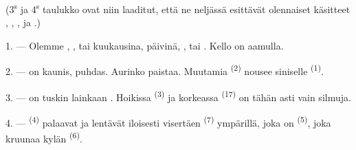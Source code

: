 %

\VUsaut{3.0mm}
\VUsaut{1.6mm}
\VUsaut{3.4mm}

(3\textsuperscript{s} ja 4\textsuperscript{s} taulukko ovat niin laaditut, että
ne neljässä  esittävät olennaiset käsitteet
, , ,  ja
.)
\VUsaut{4.0mm}

\VUsaut{3.0mm}

\VUsaut{2.4mm}

\VUsaut{3.0mm}

1. --- Olemme , ,  tai
 kuukausina,  päivinä, ,
 tai . Kello on 
aamulla.

2. ---  on kaunis,  puhdas. Aurinko paistaa. Muutamia
 \textsuperscript{(2)} nousee siniselle 
\textsuperscript{(1)}.

3. ---  on tuskin lainkaan . Hoikissa
 \textsuperscript{(3)} ja korkeassa 
\textsuperscript{(17)} on tähän asti vain silmuja.

4. ---  \textsuperscript{(4)} palaavat ja lentävät iloisesti
visertäen  \textsuperscript{(7)} ympärillä, joka on
 \textsuperscript{(5)}, joka kruunaa kylän
 \textsuperscript{(6)}.

